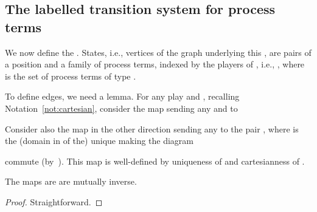 \documentclass{LMCS}
\theoremstyle{plain}\newtheorem{satz}[thm]{Satz}
\begin{document}
\subsection{The labelled transition system for process terms}
We now define the \lts{} . States, i.e., vertices of
the graph underlying this \lts{}, are pairs  of a position 
and a family  of process terms, indexed by the players of ,
i.e., , where 
is the set of process terms of type .


To define edges, we need a lemma. For any play 
and , recalling Notation~\ref{not:cartesian},
consider the map 
 sending any  and  to


Consider also the map  in the other direction sending any  to the pair , where  is the (domain in  of
the) unique  making the diagram
\begin{center}
\end{center}
commute (by~).  This map  is well-defined by
uniqueness of  and cartesianness of .
\begin{lem}\label{lem:ru}
The maps  are  are mutually inverse.
\end{lem}
\begin{proof}
  Straightforward.
\end{proof}
\end{document}
